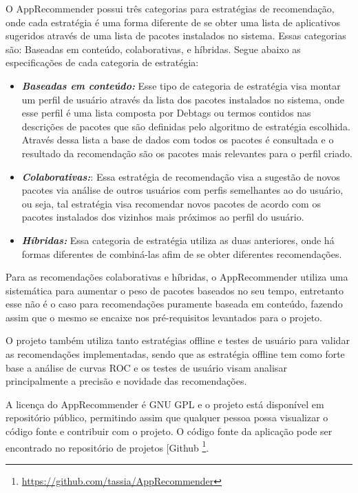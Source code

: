 O AppRecommender possui três categorias para estratégias de recomendação, onde cada
estratégia é uma forma diferente de se obter uma lista de aplicativos sugeridos
através de uma lista de pacotes instalados no sistema. Essas categorias são: Baseadas em conteúdo,
colaborativas, e híbridas. Segue abaixo as especificações de cada categoria de estratégia:

\begin{itemize}
    \item \textit{\textbf{Baseadas em conteúdo:}} Esse tipo de categoria de estratégia
        visa montar um perfil de usuário através da lista dos pacotes instalados no sistema,
        onde esse perfil é uma lista composta por Debtags ou termos contidos nas descrições de pacotes que são
        definidas pelo algoritmo de estratégia escolhida. Através dessa lista a base de dados
        com todos os pacotes é consultada e o resultado da recomendação são os pacotes mais
        relevantes para o perfil criado.
    \item \textit{\textbf{Colaborativas:}}: Essa estratégia de recomendação visa
        a sugestão de novos pacotes via análise de outros usuários com perfis
        semelhantes ao do usuário, ou seja, tal estratégia visa recomendar novos
        pacotes de acordo com os pacotes instalados dos vizinhos mais próximos
        ao perfil do usuário.
    \item \textit{\textbf{Híbridas:}} Essa categoria
        de estratégia utiliza as duas anteriores, onde há formas diferentes de combiná-las
        afim de se obter diferentes recomendações.
\end{itemize}

Para as recomendações colaborativas e híbridas, o AppRecommender
utiliza uma sistemática para aumentar o peso de pacotes baseados no seu tempo,
entretanto esse não é o caso para recomendações puramente baseada em conteúdo,
fazendo assim que o mesmo se encaixe nos pré-requisitos levantados para o
projeto.

O projeto também utiliza tanto estratégias offline e testes de usuário para
validar as recomendações implementadas, sendo que as estratégia offline tem como
forte base a análise de curvas ROC e os testes de usuário visam analisar
principalmente a precisão e novidade das recomendações.

A licença do AppRecommender é GNU GPL e o projeto está disponível em repositório
público, permitindo assim que qualquer pessoa possa visualizar o código fonte e
contribuir com o projeto. O código fonte da aplicação pode ser encontrado no
repositório de projetos [Github \footnote{\url{https://github.com/tassia/AppRecommender}}.

